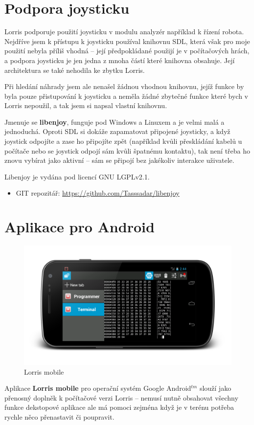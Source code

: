 \documentclass[12pt, a4paper, oneside]{article}
\begin{document}
\section{Podpora joysticku}
Lorris podporuje použití joysticku v modulu analyzér například k řízení robota. Nejdříve jsem k přístupu k joysticku používal knihovnu SDL\cite{sdl}, která však pro moje použití nebyla příliš vhodná -- její předpokládané použijí je v počítačových hrách, a podpora joysticku je jen jedna z mnoha částí které knihovna obsahuje. Její architektura se také nehodila ke zbytku Lorris.

Při hledání náhrady jsem ale nenašel žádnou vhodnou knihovnu, jejíž funkce by byla pouze přistupování k joysticku a neměla žádné zbytečné funkce které bych v Lorris nepoužil, a tak jsem si napsal vlastní knihovnu.

Jmenuje se {\bf libenjoy}, funguje pod Windows a Linuxem a je velmi malá a jednoduchá. Oproti SDL si dokáže zapamatovat připojené joysticky, a když joystick odpojíte a zase ho připojíte zpět (například kvůli přeskládání kabelů u počítače nebo se joystick odpojí sám kvůli špatnému kontaktu), tak není třeba ho znovu vybírat jako aktivní -- sám se připojí bez jakékoliv interakce uživatele.

Libenjoy je vydána pod licencí GNU LGPLv2.1\cite{lgpl}.

\begin{itemize}
\item GIT repozitář: \url{https://github.com/Tasssadar/libenjoy}
\end{itemize}

\newpage
\section{Aplikace pro Android}
\begin{figure}[H]
\begin{center}
\includegraphics[width=\textwidth]{img/mobile.png}
\caption{Lorris mobile}
\end{center}
\end{figure}
Aplikace {\bf Lorris mobile} pro operační systém Google Android$^{tm}$ slouží jako přenosný doplněk k počítačové verzi Lorris -- nemusí nutně obsahovat všechny funkce dekstopové aplikace ale má pomoci zejména když je v terénu potřeba rychle něco přenastavit či poupravit.
\end{document}

